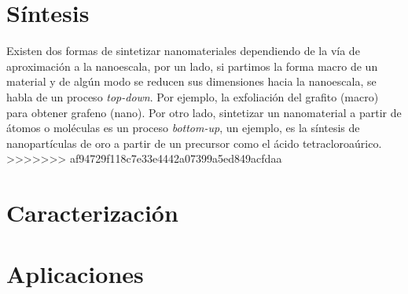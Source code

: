 \section{Síntesis}
Existen dos formas de sintetizar nanomateriales dependiendo de la vía de aproximación a la nanoescala, por un lado, si partimos la forma macro de un material y de algún modo se reducen sus dimensiones hacia la nanoescala, se habla de un proceso \textit{top-down}. Por ejemplo, la exfoliación del grafito (macro) para obtener grafeno (nano).  Por otro lado, sintetizar un nanomaterial a partir de átomos o moléculas es un proceso \textit{bottom-up}, un ejemplo, es la síntesis de nanopartículas de oro a partir de un precursor como el ácido tetracloroaúrico.
>>>>>>> af94729f118c7e33e4442a07399a5ed849acfdaa

\section{Caracterización}

\section{Aplicaciones}
